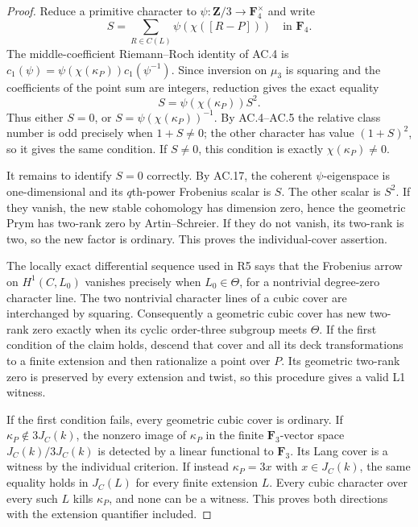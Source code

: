 \begin{proof}
Reduce a primitive character to $\psi:\mathbf Z/3\to\mathbf F_4^\times$
and write
\[
                 S=\sum_{R\in C(L)}\psi(\chi([R-P]))
                         \quad\text{in }\mathbf F_4.
\]
The middle-coefficient Riemann--Roch identity of AC.4 is
$c_1(\psi)=\psi(\chi(\kappa_P))c_1(\psi^{-1})$.
Since inversion on $\mu_3$ is squaring and the coefficients of the
point sum are integers, reduction gives the exact equality
\[
                    S=\psi(\chi(\kappa_P))S^2.          \tag{AC.13}
\]
Thus either $S=0$, or $S=\psi(\chi(\kappa_P))^{-1}$.
By AC.4--AC.5 the relative class number is odd precisely when
$1+S\ne0$; the other character has value $(1+S)^2$, so it gives the
same condition.  If $S\ne0$, this condition is exactly
$\chi(\kappa_P)\ne0$.

It remains to identify $S=0$ correctly.  By AC.17, the coherent
$\psi$-eigenspace is one-dimensional and its $q$th-power Frobenius
scalar is $S$.  The other scalar is $S^2$.
If they vanish, the new stable cohomology has dimension zero, hence
the geometric Prym has two-rank zero by Artin--Schreier.  If they do
not vanish, its two-rank is two, so the new factor is ordinary.
This proves the individual-cover assertion.

The locally exact differential sequence used in R5 says that the
Frobenius arrow on $H^1(C,L_0)$ vanishes precisely when
$L_0\in\Theta$, for a nontrivial degree-zero character line.
The two nontrivial character lines of a cubic cover are interchanged
by squaring.  Consequently a geometric cubic cover has new two-rank
zero exactly when its cyclic order-three subgroup meets $\Theta$.
If the first condition of the claim holds, descend that cover and all
its deck transformations to a finite extension and then rationalize
a point over $P$.  Its geometric two-rank zero is preserved by every
extension and twist, so this procedure gives a valid L1 witness.

If the first condition fails, every geometric cubic cover is ordinary.
If $\kappa_P\notin3J_C(k)$, the nonzero image of $\kappa_P$ in the
finite $\mathbf F_3$-vector space $J_C(k)/3J_C(k)$ is detected by a
linear functional to $\mathbf F_3$.  Its Lang cover is a witness by
the individual criterion.  If instead $\kappa_P=3x$ with $x\in J_C(k)$,
the same equality holds in $J_C(L)$ for every finite extension $L$.
Every cubic character over every such $L$ kills $\kappa_P$, and none
can be a witness.  This proves both directions with the extension
quantifier included.
\end{proof}


